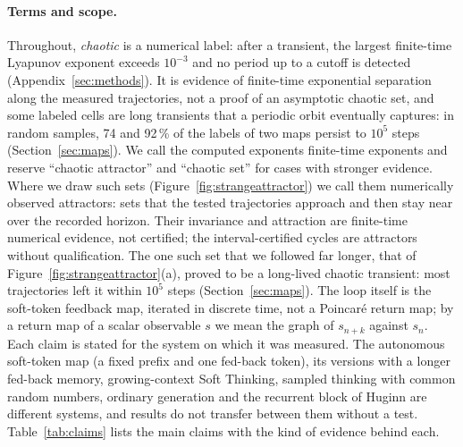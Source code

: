 \documentclass[11pt,letterpaper]{article}
\begin{document}
\paragraph{Terms and scope.} Throughout, \emph{chaotic} is a numerical label: after a transient, the largest
finite-time Lyapunov exponent exceeds $10^{-3}$ and no period up to a cutoff is detected (Appendix~\ref{sec:methods}).
It is evidence of finite-time exponential separation along the measured trajectories, not a proof of an asymptotic
chaotic set, and some labeled cells are long transients that a periodic orbit eventually captures: in random samples,
74 and 92\,\% of the labels of two maps persist to $10^5$ steps (Section~\ref{sec:maps}). We call the computed
exponents finite-time exponents and reserve ``chaotic attractor'' and ``chaotic set'' for cases with stronger evidence.
Where we draw such sets (Figure~\ref{fig:strangeattractor}) we call them numerically observed attractors: sets that the
tested trajectories approach and then stay near over the recorded horizon. Their invariance and attraction are
finite-time numerical evidence, not certified; the interval-certified cycles are attractors without qualification.
The one such set that we followed far longer, that of Figure~\ref{fig:strangeattractor}(a), proved to be a long-lived
chaotic transient: most trajectories left it within $10^5$ steps (Section~\ref{sec:maps}).
The loop itself is the soft-token feedback map, iterated in discrete time, not a Poincar\'e return map; by a return map
of a scalar observable $s$ we mean the graph of $s_{n+k}$ against $s_n$.
Each claim is stated for the system on which it was measured. The autonomous soft-token map (a fixed prefix and one
fed-back token), its versions with a longer fed-back memory, growing-context Soft Thinking, sampled thinking with
common random numbers, ordinary generation and the recurrent block of Huginn are different systems, and results do
not transfer between them without a test. Table~\ref{tab:claims} lists the main claims with the kind of evidence behind
each.
\end{document}
